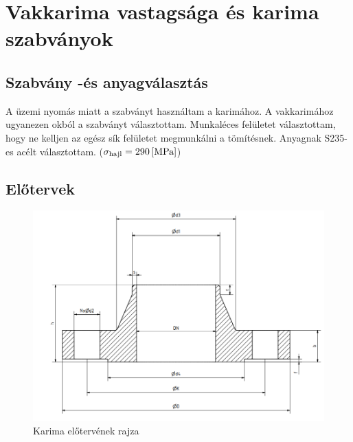 \section{Vakkarima vastagsága és karima szabványok}

\subsection{Szabvány -és anyagválasztás}
A \siunit{\pu}{\bar} üzemi nyomás miatt a \karimaszabvany szabványt használtam a karimához. A vakkarimához ugyanezen okból a \vakkarimaszabvany szabványt választottam. Munkaléces felületet választottam, hogy ne kelljen az egész sík felületet megmunkálni a tömítésnek. Anyagnak S235-es acélt választottam. ($\sigma_\text{hajl} = \SI{290}{[\mega\pascal]}$)

\newpage
\subsection{Előtervek}
\begin{figure}[hbt!]
	\centering
	\includegraphics[scale=.61]{./images/karima.png}
	\caption{Karima előtervének rajza}
\end{figure}

